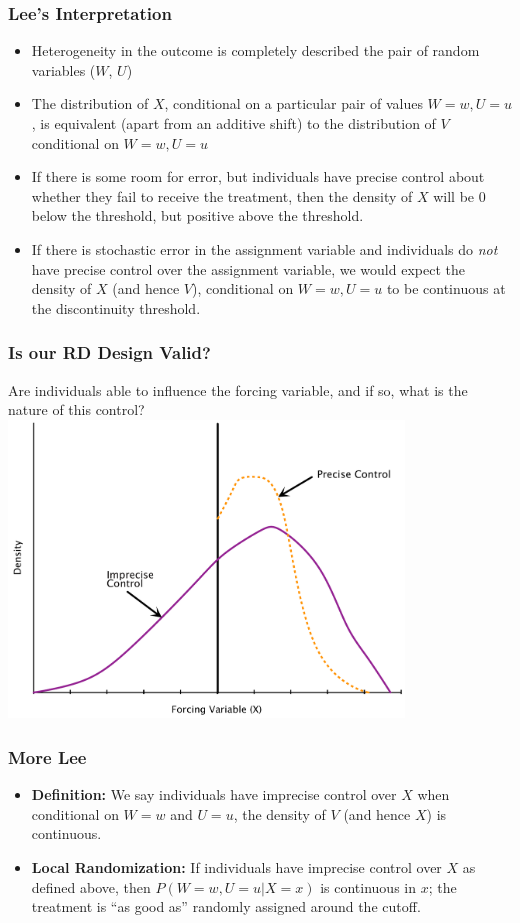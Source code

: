 \documentclass{beamer}
\begin{document}
\begin{frame}[t]\frametitle{Lee's Interpretation}
	\begin{itemize}
		\item<+-> Heterogeneity in the outcome is completely described the pair of random variables ($W$, $U$)
		\item<+-> The distribution of $X$, conditional on a particular pair of values $W=w, U=u$, is equivalent (apart from an additive shift) to the distribution of $V$ conditional on $W=w, U=u$
		\item<+-> If there is some room for error, but individuals have precise control about whether they fail to receive the treatment, then the density of $X$ will be 0 below the threshold, but positive above the threshold. 
		\item<+-> If there is stochastic error in the assignment variable and individuals do \emph{not} have precise control over the assignment variable, we would expect the density of $X$ (and hence $V$), conditional on $W=w, U=u$ to be continuous at the discontinuity threshold. 
	\end{itemize}
\end{frame}

\begin{frame}
  \frametitle{Is our RD Design Valid?}
Are individuals able to influence the forcing variable, and if so,
what is the nature of this control?
  \includegraphics[width=10.5cm]{forcing_control.pdf}  
\end{frame}

\begin{frame}[c]\frametitle{More Lee}
	\begin{itemize}
		\item<+-> \textbf{Definition:} We say individuals have imprecise control over $X$ when conditional on $W=w$ and $U=u$, the density of $V$ (and hence $X$) is continuous.
		\item<+-> \textbf{Local Randomization:} If individuals have imprecise control over $X$ as defined above, then $P(W=w,U=u|X=x)$ is continuous in $x$; the treatment is ``as good as'' randomly assigned around the cutoff. 
	\end{itemize}
\end{frame}
\end{document}
